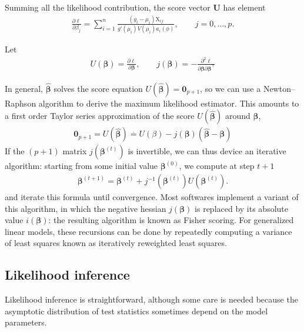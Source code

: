\documentclass[
  11pt,
  letterpaper,
]{book}
\theoremstyle{definition}
\theoremstyle{definition}
\theoremstyle{definition}
\theoremstyle{remark}
\begin{document}
Summing all the likelihood contribution, the score vector
\(\boldsymbol{U}\) has element
\begin{align*}
\frac{\partial \ell}{\partial \beta_j} = \sum_{i=1}^n \frac{(y_i-\mu_i)\mathrm{X}_{ij}}{g'(\mu_i)V(\mu_i)a_i(\phi)}, \qquad j=0, \ldots, p.
\end{align*}

Let
\begin{align*}
U(\boldsymbol{\beta}) = \frac{\partial \ell}{\partial \boldsymbol{\beta}}, \qquad j(\boldsymbol{\beta}) = - \frac{\partial^2 \ell}{\partial \boldsymbol{\beta} \partial \boldsymbol{\beta}^\top}
\end{align*}

In general, \(\widehat{\boldsymbol{\beta}}\) solves the score equation \(U(\widehat{\boldsymbol{\beta}})=\boldsymbol{0}_{p+1}\), so we can use a Newton--Raphson algorithm to derive the maximum likelihood
estimator. This amounts to a first order Taylor series approximation of
the score \(U(\widehat{\boldsymbol{\beta}})\) around \(\boldsymbol{\beta}\),
\begin{align*}
\boldsymbol{0}_{p+1} = U(\widehat{\boldsymbol{\beta}}) \stackrel{\cdot}{=} U(\beta) - j(\boldsymbol{\beta}) (\widehat{\boldsymbol{\beta}}-\boldsymbol{\beta})
\end{align*}
If the \((p+1)\) matrix \(j(\boldsymbol{\beta}^{(t)})\) is
invertible, we can thus device an iterative algorithm: starting from
some initial value \(\boldsymbol{\beta}^{(0)}\), we compute at step \(t+1\)
\begin{align*}
\boldsymbol{\beta}^{(t+1)} = \boldsymbol{\beta}^{(t)} + j^{-1}(\boldsymbol{\beta}^{(t)})U(\boldsymbol{\beta}^{(t)}).
\end{align*}
and iterate this formula until convergence. Most softwares
implement a variant of this algorithm, in which the negative hessian
\(j(\boldsymbol{\beta})\) is replaced by its absolute value
\(i(\boldsymbol{\beta})\): the resulting algorithm is known as Fisher
scoring. For generalized linear models, these recursions can be done by
repeatedly computing a variance of least squares known as iteratively
reweighted least squares.

\hypertarget{likelihood-inference}{%
\subsection{Likelihood inference}\label{likelihood-inference}}

Likelihood inference is straightforward, although some care is needed
because the asymptotic distribution of test statistics sometimes depend
on the model parameters.
\end{document}
